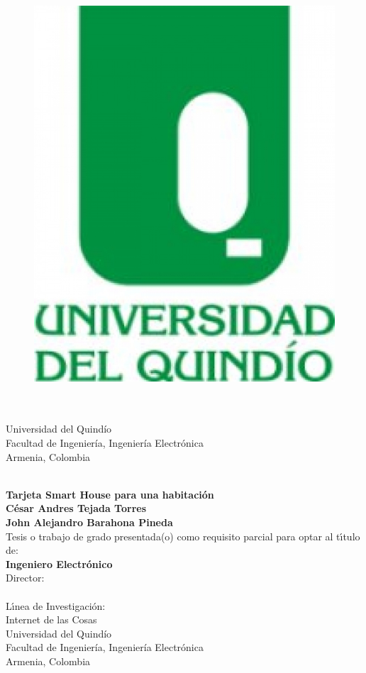 \begin{center}
	\begin{figure}
		\centering
		\includegraphics[width=0.2\linewidth]{Imagenes/escudo}
	\end{figure}
\thispagestyle{empty} \vspace*{2.0cm} \textbf{\huge
\tituloTesis}\\[5.0cm]
\Large\textbf{\autorTesis}\\[4.7cm] %
\small Universidad del Quindío\\
Facultad de Ingeniería, Ingeniería Electrónica\\
Armenia, Colombia\\
\anioTesis\\
\end{center}

\newpage{\pagestyle{empty}\cleardoublepage}


\newpage
\begin{center}
\thispagestyle{empty} \vspace*{0cm} \textbf{\huge
Tarjeta Smart House para una habitación}\\[4.0cm]
\Large\textbf{César Andres Tejada Torres\\John Alejandro Barahona Pineda}\\[3.0cm]
\small Tesis o trabajo de grado presentada(o) como requisito parcial para optar al
t\'{\i}tulo de:\\
\textbf{Ingeniero Electrónico}\\[2.1cm] %
Director:\\
\directorTesis\\[4.0cm]
L\'{\i}nea de Investigaci\'{o}n:\\
Internet de las Cosas\\
Universidad del Quindío\\
Facultad de Ingeniería, Ingeniería Electrónica\\
Armenia, Colombia\\
\anioTesis\\
\end{center}

\newpage
\thispagestyle{empty} \textbf{}\normalsize
\\\\\\%

